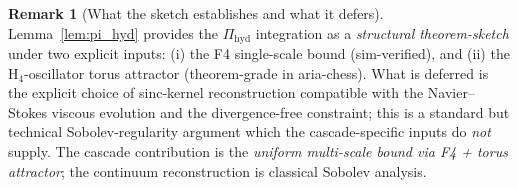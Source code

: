 \documentclass[11pt, a4paper]{amsart}
\theoremstyle{definition}
\newtheorem{remark}[theorem]{Remark}
\begin{document}
\begin{remark}[What the sketch establishes and what it defers]
Lemma~\ref{lem:pi_hyd} provides the $\Pi_{\mathrm{hyd}}$ integration
as a \emph{structural theorem-sketch} under two explicit inputs:
(i) the F4 single-scale bound (sim-verified), and (ii) the
H$_4$-oscillator torus attractor (theorem-grade in aria-chess).
What is deferred is the explicit choice of sinc-kernel reconstruction
compatible with the Navier--Stokes viscous evolution and the
divergence-free constraint; this is a standard but technical
Sobolev-regularity argument which the cascade-specific inputs
do \emph{not} supply. The cascade contribution is the \emph{uniform
multi-scale bound via F4 + torus attractor}; the continuum
reconstruction is classical Sobolev analysis.
\end{remark}
\end{document}
